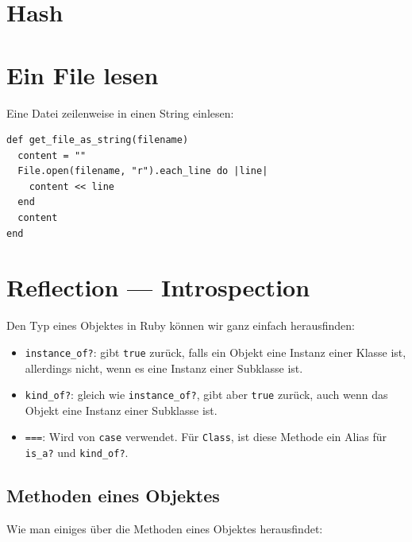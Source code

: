 \documentclass[a4book,11pt,twoside]{scrbook}
\begin{document}


\section{Hash} %
\label{sec:hash}


\section{Ein File lesen} %
\label{sec:reading_a_file}
Eine Datei zeilenweise in einen String einlesen:
\begin{lstlisting}
def get_file_as_string(filename)
  content = ""
  File.open(filename, "r").each_line do |line|
    content << line
  end
  content
end
\end{lstlisting}





\section{Reflection — Introspection} %
\label{sec:reflection_introspection}
Den Typ eines Objektes in Ruby können wir ganz einfach herausfinden:


\begin{itemize}
	\item \texttt{instance\_of?}: gibt \texttt{true} zurück, falls ein Objekt eine Instanz einer Klasse ist, allerdings nicht, wenn es eine Instanz einer Subklasse ist.
	\item \texttt{kind\_of?}: gleich wie \texttt{instance\_of?}, gibt aber \texttt{true} zurück, auch wenn das Objekt eine Instanz einer Subklasse ist.
	\item \texttt{===}: Wird von \texttt{case} verwendet. Für \texttt{Class}, ist diese Methode ein Alias für \texttt{is\_a?} und \texttt{kind\_of?}.
\end{itemize}

\subsection*{Methoden eines Objektes} %
\label{sub:methoden_eines_objektes}
Wie man einiges über die Methoden eines Objektes herausfindet:


\end{document}

